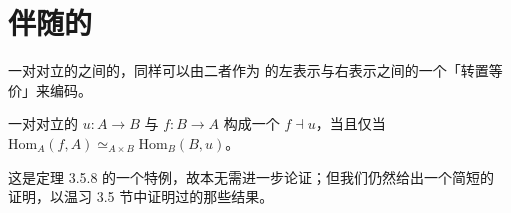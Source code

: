 \providecommand{\qcOne}{\mathbf{1}}   %
\providecommand{\qcor}[1]{\ulcorner#1\urcorner}   %

\section{伴随的\trUniversalProperty}\label{sec:universal-property-of-adjunctions}

一对对立的\trFunctor{}之间的\trAdjunction{}，同样可以由二者作为%
\trCommaInfinityCategory{}的左表示与右表示之间的一个「转置等价」来编码。

\begin{proposition}\label{prop:adjunction-as-fibered-equivalence}
一对对立的\trFunctor{} $u\colon A\to B$ 与 $f\colon B\to A$ 构成一个%
\trAdjunction{} $f\dashv u$，当且仅当
$\mathrm{Hom}_A(f,A)\simeq_{A\times B}\mathrm{Hom}_B(B,u)$。
\end{proposition}

这是定理 3.5.8 的一个特例，故本无需进一步论证；但我们仍然给出一个简短的%
证明，以温习 3.5 节中证明过的那些结果。

